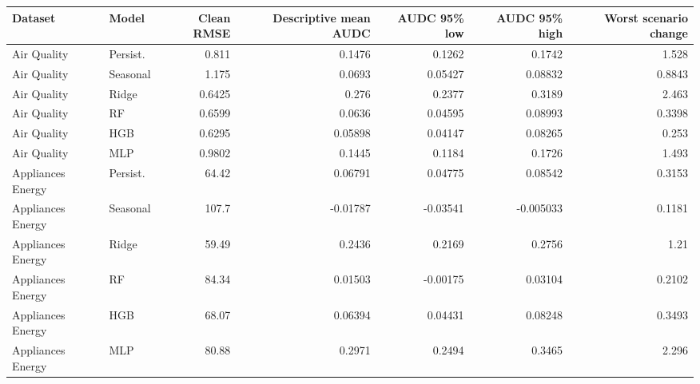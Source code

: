 \begin{tabular}{llrrrrr}
\toprule
Dataset & Model & Clean RMSE & Descriptive mean AUDC & AUDC 95\% low & AUDC 95\% high & Worst scenario change \\
\midrule
Air Quality & Persist. & 0.811 & 0.1476 & 0.1262 & 0.1742 & 1.528 \\
Air Quality & Seasonal & 1.175 & 0.0693 & 0.05427 & 0.08832 & 0.8843 \\
Air Quality & Ridge & 0.6425 & 0.276 & 0.2377 & 0.3189 & 2.463 \\
Air Quality & RF & 0.6599 & 0.0636 & 0.04595 & 0.08993 & 0.3398 \\
Air Quality & HGB & 0.6295 & 0.05898 & 0.04147 & 0.08265 & 0.253 \\
Air Quality & MLP & 0.9802 & 0.1445 & 0.1184 & 0.1726 & 1.493 \\
Appliances Energy & Persist. & 64.42 & 0.06791 & 0.04775 & 0.08542 & 0.3153 \\
Appliances Energy & Seasonal & 107.7 & -0.01787 & -0.03541 & -0.005033 & 0.1181 \\
Appliances Energy & Ridge & 59.49 & 0.2436 & 0.2169 & 0.2756 & 1.21 \\
Appliances Energy & RF & 84.34 & 0.01503 & -0.00175 & 0.03104 & 0.2102 \\
Appliances Energy & HGB & 68.07 & 0.06394 & 0.04431 & 0.08248 & 0.3493 \\
Appliances Energy & MLP & 80.88 & 0.2971 & 0.2494 & 0.3465 & 2.296 \\
\bottomrule
\end{tabular}
